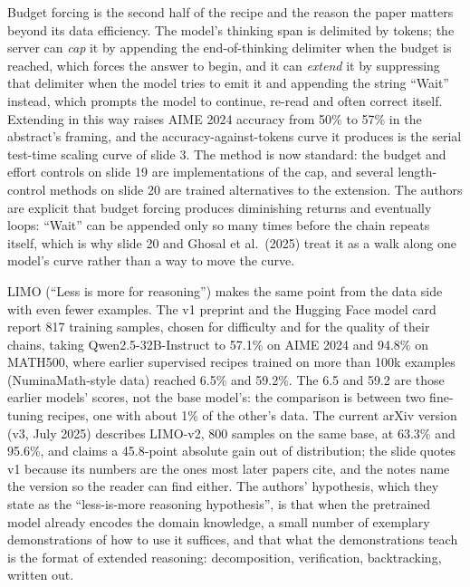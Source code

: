 \documentclass[11pt,letterpaper]{article}
\begin{document}
Budget forcing is the second half of the recipe and the reason the paper matters beyond its data efficiency. The model's thinking span is delimited by tokens; the server can \emph{cap} it by appending the end-of-thinking delimiter when the budget is reached, which forces the answer to begin, and it can \emph{extend} it by suppressing that delimiter when the model tries to emit it and appending the string ``Wait'' instead, which prompts the model to continue, re-read and often correct itself. Extending in this way raises AIME 2024 accuracy from 50\% to 57\% in the abstract's framing, and the accuracy-against-tokens curve it produces is the serial test-time scaling curve of slide 3. The method is now standard: the budget and effort controls on slide 19 are implementations of the cap, and several length-control methods on slide 20 are trained alternatives to the extension. The authors are explicit that budget forcing produces diminishing returns and eventually loops: ``Wait'' can be appended only so many times before the chain repeats itself, which is why slide 20 and Ghosal et al.\ (2025) treat it as a walk along one model's curve rather than a way to move the curve.

LIMO (``Less is more for reasoning'') makes the same point from the data side with even fewer examples. The v1 preprint and the Hugging Face model card report 817 training samples, chosen for difficulty and for the quality of their chains, taking Qwen2.5-32B-Instruct to 57.1\% on AIME 2024 and 94.8\% on MATH500, where earlier supervised recipes trained on more than 100k examples (NuminaMath-style data) reached 6.5\% and 59.2\%. The 6.5 and 59.2 are those earlier models' scores, not the base model's: the comparison is between two fine-tuning recipes, one with about 1\% of the other's data. The current arXiv version (v3, July 2025) describes LIMO-v2, 800 samples on the same base, at 63.3\% and 95.6\%, and claims a 45.8-point absolute gain out of distribution; the slide quotes v1 because its numbers are the ones most later papers cite, and the notes name the version so the reader can find either. The authors' hypothesis, which they state as the ``less-is-more reasoning hypothesis'', is that when the pretrained model already encodes the domain knowledge, a small number of exemplary demonstrations of how to use it suffices, and that what the demonstrations teach is the format of extended reasoning: decomposition, verification, backtracking, written out.
\end{document}

